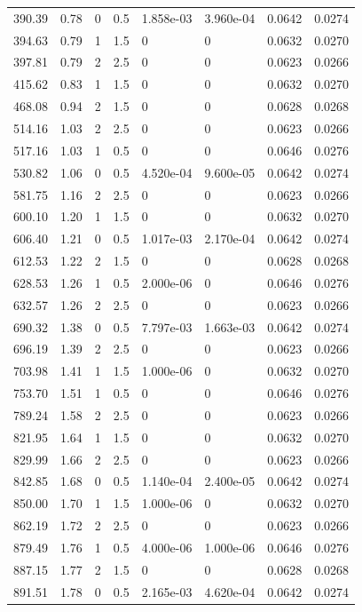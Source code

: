 \documentclass[preview]{standalone}
\begin{document}
{{\begin{tabular}{L{1.2cm}C{1.2cm} C{0.3cm}C{0.5cm} C{1.4cm}C{1.4cm} C{1.4cm}C{1.4cm}}
  390.39  &  0.78  & 0     & 0.5 &  1.858e-03  & 3.960e-04  & 0.0642 &  0.0274   \\ 
  394.63  &  0.79  & 1     & 1.5 &  0  & 0  & 0.0632 &  0.0270   \\ 
  397.81  &  0.79  & 2     & 2.5 &  0  & 0  & 0.0623 &  0.0266   \\ 
  415.62  &  0.83  & 1     & 1.5 &  0  & 0  & 0.0632 &  0.0270   \\ 
  468.08  &  0.94  & 2     & 1.5 &  0  & 0  & 0.0628 &  0.0268   \\ 
  514.16  &  1.03  & 2     & 2.5 &  0  & 0  & 0.0623 &  0.0266   \\ 
  517.16  &  1.03  & 1     & 0.5 &  0  & 0  & 0.0646 &  0.0276   \\ 
  530.82  &  1.06  & 0     & 0.5 &  4.520e-04  & 9.600e-05  & 0.0642 &  0.0274   \\ 
  581.75  &  1.16  & 2     & 2.5 &  0  & 0  & 0.0623 &  0.0266   \\ 
  600.10  &  1.20  & 1     & 1.5 &  0  & 0  & 0.0632 &  0.0270   \\ 
  606.40  &  1.21  & 0     & 0.5 &  1.017e-03  & 2.170e-04  & 0.0642 &  0.0274   \\ 
  612.53  &  1.22  & 2     & 1.5 &  0  & 0  & 0.0628 &  0.0268   \\ 
  628.53  &  1.26  & 1     & 0.5 &  2.000e-06  & 0  & 0.0646 &  0.0276   \\ 
  632.57  &  1.26  & 2     & 2.5 &  0  & 0  & 0.0623 &  0.0266   \\ 
  690.32  &  1.38  & 0     & 0.5 &  7.797e-03  & 1.663e-03  & 0.0642 &  0.0274   \\ 
  696.19  &  1.39  & 2     & 2.5 &  0  & 0  & 0.0623 &  0.0266   \\ 
  703.98  &  1.41  & 1     & 1.5 &  1.000e-06  & 0  & 0.0632 &  0.0270   \\ 
  753.70  &  1.51  & 1     & 0.5 &  0  & 0  & 0.0646 &  0.0276   \\ 
  789.24  &  1.58  & 2     & 2.5 &  0  & 0  & 0.0623 &  0.0266   \\ 
  821.95  &  1.64  & 1     & 1.5 &  0  & 0  & 0.0632 &  0.0270   \\ 
  829.99  &  1.66  & 2     & 2.5 &  0  & 0  & 0.0623 &  0.0266   \\ 
  842.85  &  1.68  & 0     & 0.5 &  1.140e-04  & 2.400e-05  & 0.0642 &  0.0274   \\ 
  850.00  &  1.70  & 1     & 1.5 &  1.000e-06  & 0  & 0.0632 &  0.0270   \\ 
  862.19  &  1.72  & 2     & 2.5 &  0  & 0  & 0.0623 &  0.0266   \\ 
  879.49  &  1.76  & 1     & 0.5 &  4.000e-06  & 1.000e-06  & 0.0646 &  0.0276   \\ 
  887.15  &  1.77  & 2     & 1.5 &  0  & 0  & 0.0628 &  0.0268   \\ 
  891.51  &  1.78  & 0     & 0.5 &  2.165e-03  & 4.620e-04  & 0.0642 &  0.0274   \\ 
\hline 
\end{tabular} 

}}
\end{document}
